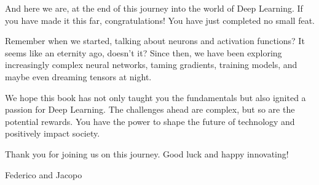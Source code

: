\documentclass[11pt,fleqn,oneside]{book} %
\begin{document}
And here we are, at the end of this journey into the world of Deep Learning. If you have made it this far, congratulations! You have just completed no small feat.

Remember when we started, talking about neurons and activation functions? It seems like an eternity ago, doesn't it? Since then, we have been exploring increasingly complex neural networks, taming gradients, training models, and maybe even dreaming tensors at night.

We hope this book has not only taught you the fundamentals but also ignited a passion for Deep Learning. The challenges ahead are complex, but so are the potential rewards. You have the power to shape the future of technology and positively impact society.

Thank you for joining us on this journey.
Good luck and happy innovating!

\hfill Federico and Jacopo


\end{document}
